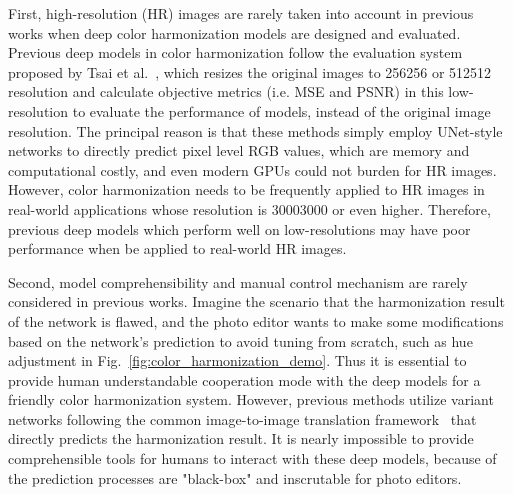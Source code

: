 \documentclass[runningheads]{llncs}
\begin{document}
First, high-resolution (HR) images are rarely taken into account in previous works when deep color harmonization models are designed and evaluated.
    Previous deep models in color harmonization follow the evaluation system proposed by Tsai et al.~\cite{tsai2017deep}, which resizes the original images to 256256 or 512512 resolution and calculate objective metrics (i.e. MSE and PSNR) in this low-resolution to evaluate the performance of models, instead of the original image resolution.
    The principal reason is that these methods simply employ UNet-style~\cite{Unet} networks to directly predict pixel level RGB values, which are memory and computational costly, and even modern GPUs could not burden for HR images. 
    However, color harmonization needs to be frequently applied to HR images in real-world applications whose resolution is 30003000 or even higher.
    Therefore, previous deep models which perform well on low-resolutions may have poor performance when be applied to real-world HR images.
    
    
Second, model comprehensibility and manual control mechanism are rarely considered in previous works.
    Imagine the scenario that the harmonization result of the network is flawed, and the photo editor wants to make some modifications based on the network's prediction to avoid tuning from scratch, such as hue adjustment in Fig.~\ref{fig:color_harmonization_demo}.
    Thus it is essential to provide human understandable cooperation mode with the deep models for a friendly color harmonization system.
    However, previous methods utilize variant networks following the common image-to-image translation framework~\cite{isola2017image} that directly predicts the harmonization result.
    It is nearly impossible to provide comprehensible tools for humans to interact with these deep models, because of the prediction processes are "black-box" and inscrutable for photo editors.
    
\end{document}
